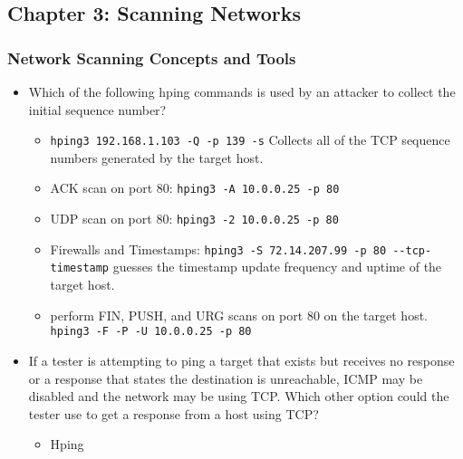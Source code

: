 \subsection{Chapter 3: Scanning Networks}
\subsubsection{Network Scanning Concepts and Tools}
\begin{itemize}
    \item Which of the following hping commands is used by an attacker to collect the initial sequence number?
    \begin{itemize}
        \item \verb|hping3 192.168.1.103 -Q -p 139 -s| Collects all of the TCP sequence numbers generated by the target host.
        \item ACK scan on port 80: \verb|hping3 -A 10.0.0.25 -p 80|
        \item UDP scan on port 80: \verb|hping3 -2 10.0.0.25 -p 80|
        \item Firewalls and Timestamps: \verb|hping3 -S 72.14.207.99 -p 80 --tcp-timestamp| guesses the timestamp update frequency and uptime of the target host.
        \item perform FIN, PUSH, and URG scans on port 80 on the target host. \verb|hping3 -F -P -U 10.0.0.25 -p 80|
    \end{itemize}
    \item If a tester is attempting to ping a target that exists but receives no response or a response that states the destination is unreachable, ICMP may be disabled and the network may be using TCP. Which other option could the tester use to get a response from a host using TCP?
    \begin{itemize}
        \item Hping
    \end{itemize}
\end{itemize}
